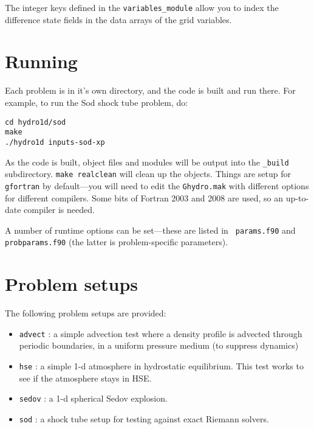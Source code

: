 The integer keys defined in the {\tt variables\_module} allow you
to index the difference state fields in the data arrays of the 
grid variables.


\section{Running \hydrooned}

Each problem is in it's own directory, and the code is built and run
there.  For example, to run the Sod shock tube problem, do:
\begin{verbatim}
cd hydro1d/sod
make
./hydro1d inputs-sod-xp
\end{verbatim}

As the code is built, object files and modules will be output into the
{\tt \_build} subdirectory.  {\tt make realclean} will clean up the
objects.  Things are setup for {\tt gfortran} by default---you will
need to edit the {\tt Ghydro.mak} with different options for different
compilers. Some bits of Fortran 2003 and 2008 are used, so an
up-to-date compiler is needed.

A number of runtime options can be set---these are listed in {\tt
  params.f90} and {\tt probparams.f90} (the latter is problem-specific
parameters).


\section{Problem setups}

The following problem setups are provided:
\begin{itemize}
\item {\tt advect} : a simple advection test where a density profile
  is advected through periodic boundaries, in a uniform pressure
  medium (to suppress dynamics)

\item {\tt hse} : a simple 1-d atmosphere in hydrostatic equilibrium.
  This test works to see if the atmosphere stays in HSE.

\item {\tt sedov} : a 1-d spherical Sedov explosion.

\item {\tt sod} : a shock tube setup for testing against exact Riemann
  solvers.
\end{itemize}


